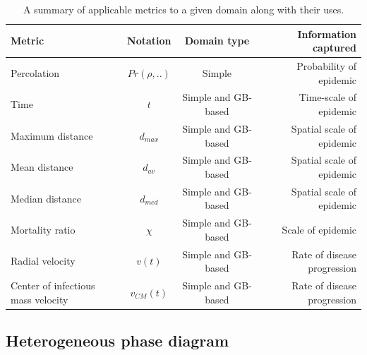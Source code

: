 \begin{table}[h!]
  \begin{center}
    \begin{tabular}{l|c|c|r} %
    \hline
      \textbf{Metric} & \textbf{Notation} & \textbf{Domain type} & \textbf{Information captured}\\
      \hline
      Percolation & $Pr(\rho,..)$ & Simple & Probability of epidemic \\
      Time & $t$ & Simple and GB-based & Time-scale of epidemic  \\
      Maximum distance & $d_{max}$ & Simple and GB-based & Spatial scale of epidemic\\
      Mean distance & $d_{av}$ & Simple and GB-based & Spatial scale of epidemic\\
      Median distance & $d_{med}$ & Simple and GB-based & Spatial scale of epidemic\\
      Mortality ratio & $\chi$ & Simple and GB-based & Scale of epidemic\\
      Radial velocity & $v(t)$ & Simple and GB-based & Rate of disease progression \\
      Center of infectious mass velocity & $v_{CM}(t)$ & Simple and GB-based & Rate of disease progression\\
    \hline
    \end{tabular}
    \caption{A summary of applicable metrics to a given domain along with their uses.}
    \label{tab:metrics}
  \end{center}
\end{table}

\subsection{Heterogeneous phase diagram}


